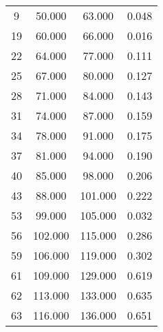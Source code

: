 % 
\begin{tabular}{cccc}
  \hline
  \hline
9 & 50.000 & 63.000 & 0.048 \\ 
  19 & 60.000 & 66.000 & 0.016 \\ 
  22 & 64.000 & 77.000 & 0.111 \\ 
  25 & 67.000 & 80.000 & 0.127 \\ 
  28 & 71.000 & 84.000 & 0.143 \\ 
  31 & 74.000 & 87.000 & 0.159 \\ 
  34 & 78.000 & 91.000 & 0.175 \\ 
  37 & 81.000 & 94.000 & 0.190 \\ 
  40 & 85.000 & 98.000 & 0.206 \\ 
  43 & 88.000 & 101.000 & 0.222 \\ 
  53 & 99.000 & 105.000 & 0.032 \\ 
  56 & 102.000 & 115.000 & 0.286 \\ 
  59 & 106.000 & 119.000 & 0.302 \\ 
  61 & 109.000 & 129.000 & 0.619 \\ 
  62 & 113.000 & 133.000 & 0.635 \\ 
  63 & 116.000 & 136.000 & 0.651 \\ 
   \hline
\end{tabular}
